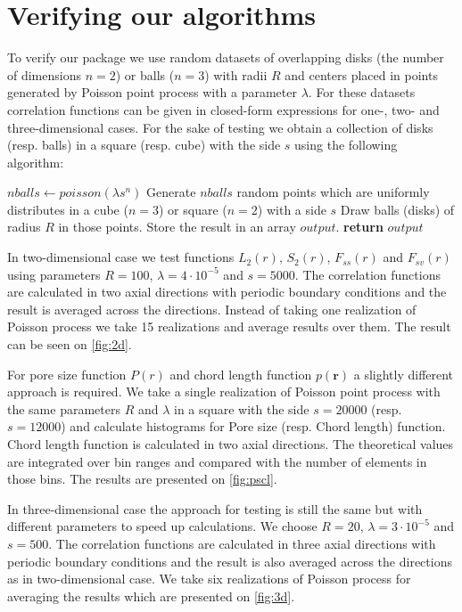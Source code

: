 \documentclass[reprint,amsmath,amssymb,aps,pre]{revtex4-1}
\begin{document}
\section{Verifying our algorithms}
To verify our package we use random datasets of overlapping disks (the number of
dimensions $n = 2$) or balls ($n = 3$) with radii $R$ and centers placed in
points generated by Poisson point process with a parameter $\lambda$. For these
datasets correlation functions can be given in closed-form expressions for one-,
two- and three-dimensional cases. For the sake of testing we obtain a collection
of disks (resp. balls) in a square (resp. cube) with the side $s$ using the
following algorithm:
\begin{algorithmic}[1]
  \label{testdata}
    \State $nballs \gets poisson(\lambda s^n)$ 
    \State Generate $nballs$ random points which are uniformly distributes in
    a cube ($n = 3$) or square ($n = 2$) with a side $s$
    \State Draw balls (disks) of radius $R$ in those points. Store the result in
    an array $output$.
    \State \textbf{return} $output$
  \EndProcedure
\end{algorithmic}

In two-dimensional case we test functions $L_2(r)$, $S_2(r)$, $F_{ss}(r)$ and
$F_{sv}(r)$ using parameters $R = 100$, $\lambda = 4\cdot10^{-5}$ and
$s = 5000$. The correlation functions are calculated in two axial directions
with periodic boundary conditions and the result is averaged across the
directions. Instead of taking one realization of Poisson process we take 15
realizations and average results over them. The result can be seen on
\cref{fig:2d}.

For pore size function $P(r)$ and chord length function $p(\bm{r})$ a slightly
different approach is required. We take a single realization of Poisson point
process with the same parameters $R$ and $\lambda$ in a square with the side
$s = 20000$ (resp. $s = 12000$) and calculate histograms for Pore size
(resp. Chord length) function. Chord length function is calculated in two axial
directions. The theoretical values are integrated over bin ranges and compared
with the number of elements in those bins. The results are presented on
\cref{fig:pscl}.

In three-dimensional case the approach for testing is still the same but with
different parameters to speed up calculations. We choose $R = 20$,
$\lambda = 3\cdot10^{-5}$ and $s = 500$. The correlation functions are
calculated in three axial directions with periodic boundary conditions and the
result is also averaged across the directions as in two-dimensional
case. We take six realizations of Poisson process for averaging the results
which are presented on \cref{fig:3d}.
\end{document}
